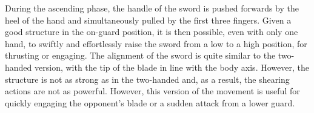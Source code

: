 During the ascending phase, the handle of the sword is pushed forwards by the heel of the hand and simultaneously pulled by the first three fingers. Given a good structure in the on-guard position, it is then possible, even with only one hand, to swiftly and effortlessly raise the sword from a low to a high position, for thrusting or engaging.  
The alignment of the sword is quite similar to the two-handed version, with the tip of the blade in line with the body axis. However, the structure is not as strong as in the two-handed \Duo{} and, as a result, the shearing actions are not as powerful. However, this version of the movement is useful for quickly engaging the opponent's blade or a sudden attack from a lower guard. 

